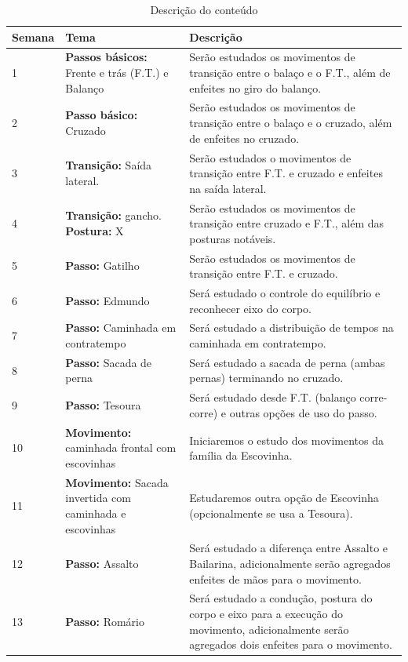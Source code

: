 \documentclass{article}
\begin{document}
\begin{table}[h]
\centering
\begin{tabular}{|p{1.5cm}|p{5cm}|p{9cm}|}
\hline
Semana & Tema & Descrição \\  \hline
1 &  \textbf{Passos básicos:} Frente e trás (F.T.) e Balanço & Serão estudados os movimentos de transição entre o balaço e o F.T., além de enfeites no giro do balanço.\\ \hline
2 &  \textbf{Passo básico:} Cruzado &  Serão estudados os movimentos de transição entre o balaço e o cruzado, além de enfeites no cruzado. \\ \hline
3 &  \textbf{Transição:} Saída lateral. &  Serão estudados o movimentos de transição entre F.T. e cruzado e enfeites na saída lateral.\\ \hline
4 &  \textbf{Transição:} gancho. \textbf{Postura:} X &  Serão estudados os movimentos de transição entre cruzado e F.T., além das posturas notáveis.\\ \hline                     
5 &  \textbf{Passo:} Gatilho &  Serão estudados os movimentos de transição entre F.T. e cruzado. \\ \hline
6 &  \textbf{Passo:} Edmundo &  Será estudado o controle do equilíbrio e reconhecer eixo do corpo. \\ \hline
7 &  \textbf{Passo:} Caminhada em contratempo & Será estudado a distribuição de tempos na caminhada em contratempo. \\ \hline
8 &  \textbf{Passo:} Sacada de perna & Será estudado a sacada de perna (ambas pernas) terminando no cruzado. \\ \hline
9 &  \textbf{Passo:} Tesoura & Será estudado desde F.T. (balanço corre-corre) e outras opções de uso do passo. \\ \hline
10&  \textbf{Movimento:} caminhada frontal com escovinhas & Iniciaremos o estudo dos movimentos da família da Escovinha. \\ \hline
11&  \textbf{Movimento:} Sacada invertida com caminhada e escovinhas & Estudaremos outra opção de Escovinha (opcionalmente se usa a Tesoura). \\ \hline
12&  \textbf{Passo:} Assalto & Será estudado a diferença entre Assalto e Bailarina, adicionalmente serão agregados enfeites de mãos para o movimento. \\ \hline
13&  \textbf{Passo:} Romário & Será estudado a condução, postura do corpo e eixo para a execução do movimento, adicionalmente serão agregados dois enfeites para o movimento. \\ \hline

\end{tabular}
\caption{Descrição do conteúdo}
\label{tab:myfirsttable}
\end{table}
\end{document}
